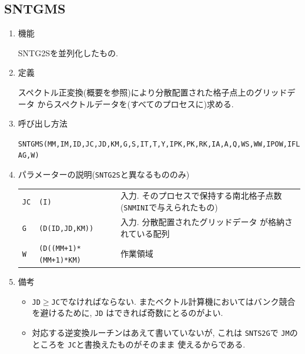 \documentclass[a4j,fleqn]{jarticle}
\begin{document}

\subsection{SNTGMS}

\begin{enumerate}

\item 機能

SNTG2Sを並列化したもの.

\item 定義

スペクトル正変換(概要を参照)により分散配置された格子点上のグリッドデータ
からスペクトルデータを(すべてのプロセスに)求める.

\item 呼び出し方法 

{\tt SNTGMS(MM,IM,ID,JC,JD,KM,G,S,IT,T,Y,IPK,PK,RK,IA,A,Q,WS,WW,IPOW,IFLAG,W)}
  
\item パラメーターの説明({\tt SNTG2S}と異なるもののみ)

\begin{tabular}{lll}
{\tt JC} & {\tt (I)} & 入力. そのプロセスで保持する南北格子点数
                        ({\tt SNMINI}で与えられたもの)\\
{\tt G} & {\tt (D(ID,JD,KM))} & 入力. 分散配置されたグリッドデータ
	が格納されている配列\\
{\tt W}  & {\tt (D((MM+1)*(MM+1)*KM)} & 作業領域
\end{tabular}

\item 備考

\begin{itemize}
\item {\tt JD}$\ge${\tt JC}でなければならない.
   またベクトル計算機においてはバンク競合を避けるために, {\tt JD}
   はできれば奇数にとるのがよい.
   
\item 対応する逆変換ルーチンはあえて書いていないが, これは
 {\tt SNTS2G}で {\tt JM}のところを {\tt JC}と書換えたものがそのまま
 使えるからである.

\end{itemize}

\end{enumerate}
\end{document}
